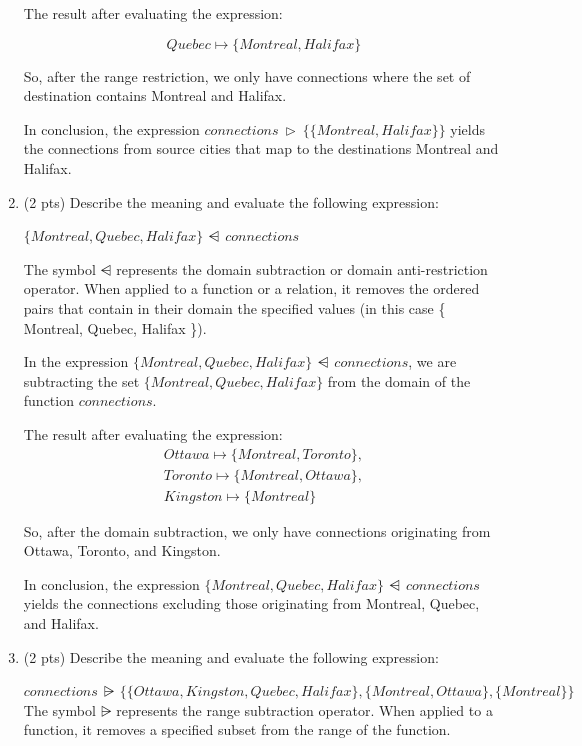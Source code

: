 \documentclass[12pt]{article}
\begin{document}
\begin{spacing}{1.5}
\begin{enumerate}
		      The result after evaluating the expression:
		      
		      $$Quebec \mapsto \{Montreal, Halifax\}$$
		      
		      So, after the range restriction, we only have connections where the set of destination contains Montreal and Halifax.
		      
		      In conclusion, the expression $connections \: \triangleright \: \{\{Montreal, Halifax\}\}$ yields the connections from source cities that map to the destinations Montreal and Halifax.
		          
		\item (2 pts) Describe the meaning and evaluate the following expression:
		      
		      $\{Montreal, Quebec, Halifax\} \: \ndres \: connections$
		      
		      The symbol $\ndres$ represents the domain subtraction or domain anti-restriction operator. When applied to a function or a relation, it removes the ordered pairs that contain in their domain the specified values (in this case \{ Montreal, Quebec, Halifax \}).
		      
		      In the expression $\{Montreal, Quebec, Halifax\} \: \ndres \: connections$, we are subtracting the set  $\{Montreal, Quebec, Halifax\}$ from the domain of the function $connections$.
		      
		      The result after evaluating the expression:
		      \begin{align*}
		      	Ottawa \mapsto \{Montreal, Toronto\}, \\
		      	Toronto \mapsto \{Montreal, Ottawa\}, \\
		      	Kingston \mapsto \{Montreal\}         
		      \end{align*}
		      
		      So, after the domain subtraction, we only have connections originating from Ottawa, Toronto, and Kingston.
		      
		      In conclusion, the expression $\{Montreal, Quebec, Halifax\} \: \ndres \: connections$ yields the connections excluding those originating from Montreal, Quebec, and Halifax.
		      
		\item (2 pts) Describe the meaning and evaluate the following expression:
		      
		      $connections \: \rsub \: \{\{Ottawa, Kingston, Quebec, Halifax\},\{Montreal, Ottawa\},\{Montreal\}\}$
		      \newline
		      The symbol $\rsub$ represents the range subtraction operator. When applied to a function, it removes a specified subset from the range of the function.
              

\end{enumerate}
\end{spacing}
\end{document}
